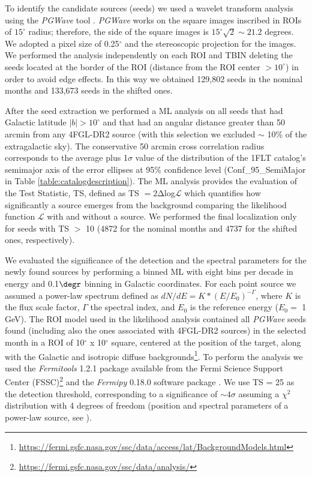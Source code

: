 \documentclass{aastex62}
\begin{document}
To identify the candidate sources (seeds) we used a wavelet transform analysis \citep{damiani1997method} using the \textit{\textit{PGWave}} tool \citep{ciprini20071d}. \textit{PGWave} works on the square images inscribed in ROIs of $15^\circ$ radius; therefore, the side of the square images is $15^\circ\sqrt{2} \sim 21.2$ degrees. We adopted a pixel size of 0.25$^\circ$ and  the stereoscopic projection for the images. We performed the analysis independently on each ROI and TBIN deleting the seeds located at the border of the ROI (distance from the ROI center $>10^\circ$) in order to avoid edge effects. In this way we obtained 129,802 seeds in the nominal months and 133,673 seeds in the shifted ones.

After the seed extraction we performed a ML analysis on all seeds that had Galactic latitude $|b|>10^\circ$ and that had an angular distance greater than 50 arcmin from any 4FGL-DR2 source (with this selection we excluded $\sim$ 10\% of the extragalactic sky).
The conservative 50 arcmin cross correlation radius corresponds to the average plus 1$\sigma$ value of the distribution of the 1FLT catalog’s semimajor axis of the error ellipses at 95\% confidence level (Conf\_95\_SemiMajor in Table \ref{table:catalogdescription}).
The ML analysis provides the evaluation of the Test Statistic, TS, defined as TS $= 2\mathrm{\Delta}$log$\mathcal{L}$ \citep{mattox1996likelihood} which quantifies how significantly a source emerges from the background comparing the likelihood function $\mathcal{L}$ with and without a source.
We performed the final localization only for seeds with TS $>$ 10 (4872 for the nominal months and 4737 for the shifted ones, respectively). 

We evaluated the significance of the detection and the spectral parameters for the newly found sources by performing a binned ML with eight bins per decade in energy and 0.1$\degr$ binning in Galactic coordinates. For each point source we assumed a power-law spectrum defined as
\begin{math}
dN/dE = K*(E/E_0)^{-\Gamma} 
\end{math},
where $K$ is the flux scale factor, $\Gamma$ the spectral index, and $E_0$ is the reference energy ($E_0=$ 1 GeV). 
The ROI model used in the likelihood analysis contained all \textit{PGWave} seeds found (including also the ones associated with 4FGL-DR2 sources) in the selected month in a ROI of 10$^\circ$ x 10$^\circ$ square, centered at the position of the target, along with the Galactic and isotropic diffuse backgrounds\footnote{\url{https://fermi.gsfc.nasa.gov/ssc/data/access/lat/BackgroundModels.html}}. To perform the analysis we used the \textit{Fermitools} 1.2.1 package available from the Fermi Science Support Center (FSSC)\footnote{\url{https://fermi.gsfc.nasa.gov/ssc/data/analysis/}} and the \textit{Fermipy} 0.18.0 software package \citep{wood2017fermipy}. 
We use TS = 25 as the detection threshold, corresponding to a significance of $\sim 4\sigma$ assuming a $\chi^2$ distribution with 4 degrees of freedom (position and spectral parameters of a power-law source, see \citealt{mattox1996likelihood}).
\end{document}
